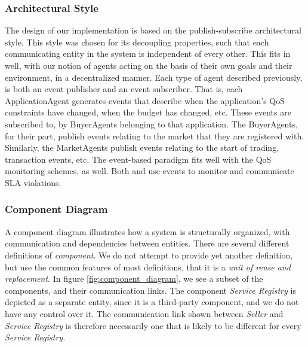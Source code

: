 \documentclass[10pt,journal,compsoc]{IEEEtran}
\begin{document}
\subsubsection{Architectural Style} The design of our implementation is based on the publish-subscribe architectural style. This style was chosen for its decoupling properties, such that each communicating entity in the system is independent of every other. This fits in well, with our notion of agents acting on the basis of their own goals and their environment, in a decentralized manner. Each type of agent described previously, is both an event publisher and an event subscriber. That is, each ApplicationAgent generates events that describe when the application's QoS constraints have changed, when the budget has changed, etc. These events are subscribed to, by BuyerAgents belonging to that application. The BuyerAgents, for their part, publish events relating to the market that they are registered with. Similarly, the MarketAgents publish events relating to the start of trading, transaction events, etc. The event-based paradigm fits well with the QoS monitoring schemes, as well. Both \cite{Zeng2007Monitoring} and \cite{Michlmayr2009Comprehensive} use events to monitor and communicate SLA violations. 
%

\subsubsection{Component Diagram} A component diagram illustrates how a system is structurally organized, with communication and dependencies between entities. There are several different definitions of \textit{component}. We do not attempt to provide yet another definition, but use the common features of most definitions, that it is a \textit{unit of reuse and replacement}\cite{Stevens2006Using}. In figure \ref{fig:component_diagram}, we see a subset of the components, and their communication links. The component \textit{Service Registry} is depicted as a separate entity, since it is a third-party component, and we do not have any control over it. The communication link shown between \textit{Seller} and \textit{Service Registry} is therefore necessarily one that is likely to be different for every \textit{Service Registry}. 
\end{document}
